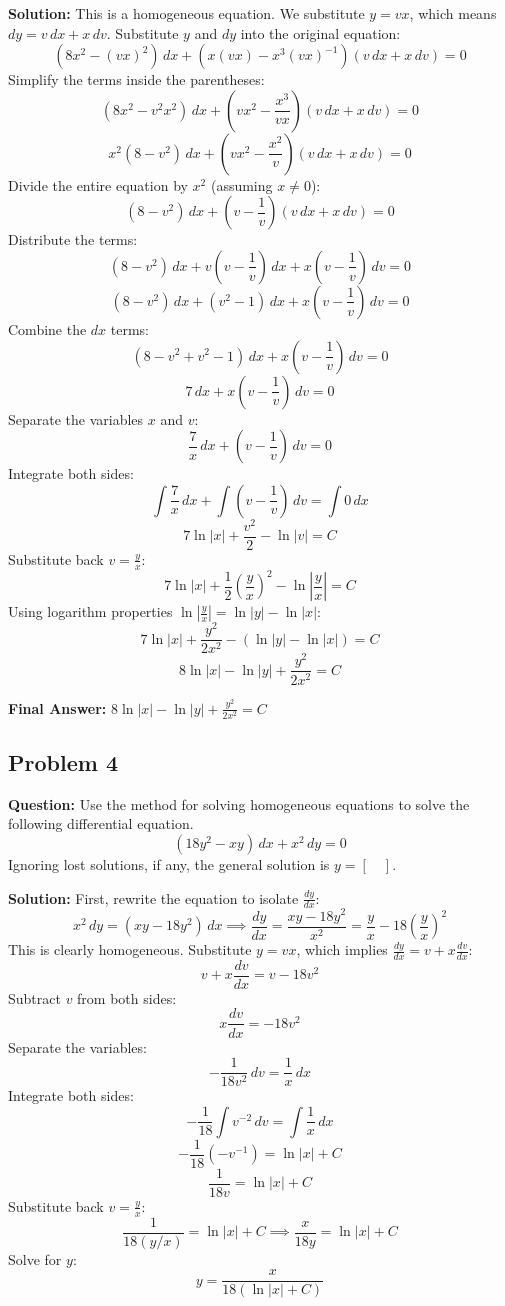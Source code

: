 \documentclass[11pt]{article}
\begin{document}
\textbf{Solution:}
This is a homogeneous equation. We substitute $y = vx$, which means $dy = v \, dx + x \, dv$.
Substitute $y$ and $dy$ into the original equation:
\[ (8x^2 - (vx)^2) \, dx + \left(x(vx) - x^3(vx)^{-1}\right) (v \, dx + x \, dv) = 0 \]
Simplify the terms inside the parentheses:
\[ (8x^2 - v^2x^2) \, dx + \left(vx^2 - \frac{x^3}{vx}\right) (v \, dx + x \, dv) = 0 \]
\[ x^2(8 - v^2) \, dx + \left(vx^2 - \frac{x^2}{v}\right) (v \, dx + x \, dv) = 0 \]
Divide the entire equation by $x^2$ (assuming $x \neq 0$):
\[ (8 - v^2) \, dx + \left(v - \frac{1}{v}\right) (v \, dx + x \, dv) = 0 \]
Distribute the terms:
\[ (8 - v^2) \, dx + v\left(v - \frac{1}{v}\right) \, dx + x\left(v - \frac{1}{v}\right) \, dv = 0 \]
\[ (8 - v^2) \, dx + (v^2 - 1) \, dx + x\left(v - \frac{1}{v}\right) \, dv = 0 \]
Combine the $dx$ terms:
\[ (8 - v^2 + v^2 - 1) \, dx + x\left(v - \frac{1}{v}\right) \, dv = 0 \]
\[ 7 \, dx + x\left(v - \frac{1}{v}\right) \, dv = 0 \]
Separate the variables $x$ and $v$:
\[ \frac{7}{x} \, dx + \left(v - \frac{1}{v}\right) \, dv = 0 \]
Integrate both sides:
\[ \int \frac{7}{x} \, dx + \int \left(v - \frac{1}{v}\right) \, dv = \int 0 \, dx \]
\[ 7\ln|x| + \frac{v^2}{2} - \ln|v| = C \]
Substitute back $v = \frac{y}{x}$:
\[ 7\ln|x| + \frac{1}{2}\left(\frac{y}{x}\right)^2 - \ln\left|\frac{y}{x}\right| = C \]
Using logarithm properties $\ln\left|\frac{y}{x}\right| = \ln|y| - \ln|x|$:
\[ 7\ln|x| + \frac{y^2}{2x^2} - (\ln|y| - \ln|x|) = C \]
\[ 8\ln|x| - \ln|y| + \frac{y^2}{2x^2} = C \]

\textbf{Final Answer:} $8\ln|x| - \ln|y| + \frac{y^2}{2x^2} = C$

\vspace{0.5cm}
\subsection*{Problem 4}
\textbf{Question:} Use the method for solving homogeneous equations to solve the following differential equation.
\[ (18y^2 - xy) \, dx + x^2 \, dy = 0 \]
Ignoring lost solutions, if any, the general solution is $y = [\quad]$.

\textbf{Solution:}
First, rewrite the equation to isolate $\frac{dy}{dx}$:
\[ x^2 \, dy = (xy - 18y^2) \, dx \implies \frac{dy}{dx} = \frac{xy - 18y^2}{x^2} = \frac{y}{x} - 18\left(\frac{y}{x}\right)^2 \]
This is clearly homogeneous. Substitute $y = vx$, which implies $\frac{dy}{dx} = v + x\frac{dv}{dx}$:
\[ v + x\frac{dv}{dx} = v - 18v^2 \]
Subtract $v$ from both sides:
\[ x\frac{dv}{dx} = -18v^2 \]
Separate the variables:
\[ -\frac{1}{18v^2} \, dv = \frac{1}{x} \, dx \]
Integrate both sides:
\[ -\frac{1}{18} \int v^{-2} \, dv = \int \frac{1}{x} \, dx \]
\[ -\frac{1}{18} \left(-v^{-1}\right) = \ln|x| + C \]
\[ \frac{1}{18v} = \ln|x| + C \]
Substitute back $v = \frac{y}{x}$:
\[ \frac{1}{18(y/x)} = \ln|x| + C \implies \frac{x}{18y} = \ln|x| + C \]
Solve for $y$:
\[ y = \frac{x}{18(\ln|x| + C)} \]
\end{document}
